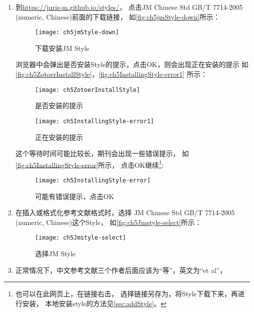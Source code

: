 \documentclass[cn,11pt,chinese]{elegantbook}
\begin{document}
			\begin{enumerate}
				\item 到\url{https://juris-m.github.io/styles/}，
				点击JM Chinese Std GB/T 7714-2005 (numeric, Chinese)前面的下载链接，
				如\autoref{fig:ch5jmStyle-down}所示：
				\begin{figure}[htbp]
					\centering
					\texttt{[image: ch5jmStyle-down]}
					\caption{下载安装JM Style}
					\label{fig:ch5jmStyle-down}
				\end{figure}
				浏览器中会弹出是否安装Style的提示，点击OK，则会出现正在安装的提示
				如\autoref{fig:ch5ZotoerInstallStyle}，\autoref{fig:ch5InstallingStyle-error1}
				所示：
				\begin{figure}[htbp]
					\centering
					\begin{minipage}[t]{\dimexpr0.5\textwidth-4em}
						\centering
						\texttt{[image: ch5ZotoerInstallStyle]}
						\caption{是否安装的提示}
						\label{fig:ch5ZotoerInstallStyle}
					\end{minipage}
					\begin{minipage}[t]{\dimexpr0.5\textwidth-4em}
						\centering
						\texttt{[image: ch5InstallingStyle-error1]}
						\caption{正在安装的提示}
						\label{fig:ch5InstallingStyle-error1}
					\end{minipage}
				\end{figure}
				这个等待时间可能比较长，期刊会出现一些错误提示，
				如
				\autoref{fig:ch5InstallingStyle-error}所示，
				点击OK继续\footnote{也可以在此网页上，在链接右击，
				选择链接另存为，将Style下载下来，再进行安装，
				本地安装style的方法见\cref{sec:addStyle}。}:
				\begin{figure}[htbp]
					\centering
						\texttt{[image: ch5InstallingStyle-error]}
						\caption{可能有错误提示，点击OK}
						\label{fig:ch5InstallingStyle-error}
					\end{figure}
			\item 在插入或格式化参考文献格式时，选择
				JM Chinese Std GB/T 7714-2005 (numeric, Chinese)这个Style，
				如\autoref{fig:ch5Jmstyle-select}所示：
				\begin{figure}[htbp]
					\centering
					\texttt{[image: ch5Jmstyle-select]}
					\caption{选择JM Style}
					\label{fig:ch5Jmstyle-select}
				\end{figure}
			\item 正常情况下，中文参考文献三个作者后面应该为“等”，英文为“et al”，

\end{enumerate}
\end{document}
